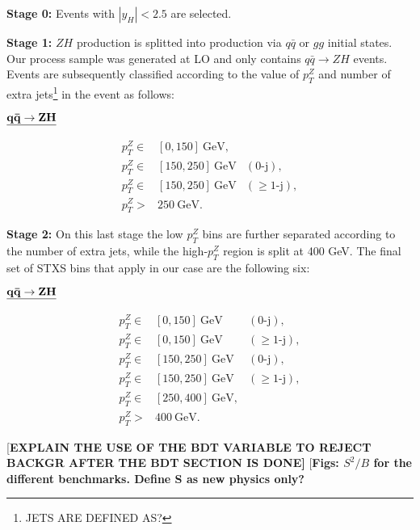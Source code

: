 \documentclass[11pt]{cernrep}
\begin{document}
\begin{itemize}
{\item  {\bf Stage 0:} Events with $\left|y_H\right| <2.5$ are selected.}
%
{\item {\bf Stage 1:} $ZH$ production is splitted into production via $q\bar{q}$ or $gg$ initial states. Our process sample was generated at LO and only contains $q\bar{q}\to ZH$ events. Events are subsequently classified according to the value of $p_T^Z$ and number of extra jets\footnote{JETS ARE DEFINED AS?} in the event as follows:
%
\vspace{0.25cm}
%
\begin{center}
${\bf \underline{q\bar{q}\to ZH}}$
\end{center}
\begin{eqnarray}
p_T^Z \in& [0,150]~\mathrm{GeV},& \nonumber\\
%
p_T^Z \in& [150,250]~\mathrm{GeV}&(0\mbox{-}\mathrm{j}),\\
%
p_T^Z \in& [150,250]~\mathrm{GeV}&(\geq 1\mbox{-}\mathrm{j}),\nonumber\\
%
p_T^Z >&250~\mathrm{GeV}.\nonumber&
\end{eqnarray}
}
%
%
{\item {\bf Stage 2:} On this last stage the low $p_T^Z$ bins are further separated according to the number of extra jets, while the high-$p_T^Z$ region is split at 400 GeV. The final set of STXS bins that apply in our case are the following six:
%
\vspace{0.25cm}
%
\begin{center}
${\bf \underline{q\bar{q}\to ZH}}$
\end{center}
\begin{eqnarray}
p_T^Z \in& [0,150]~\mathrm{GeV}&(0\mbox{-}\mathrm{j}),\nonumber\\
%
p_T^Z \in& [0,150]~\mathrm{GeV}&(\geq 1\mbox{-}\mathrm{j}),\nonumber\nonumber\\
%
p_T^Z \in& [150,250]~\mathrm{GeV}&(0\mbox{-}\mathrm{j}),\\
%
p_T^Z \in& [150,250]~\mathrm{GeV}&(\geq 1\mbox{-}\mathrm{j}),\nonumber\\
%
p_T^Z \in& [250,400]~\mathrm{GeV},&\nonumber\\
%
p_T^Z >&400~\mathrm{GeV}.\nonumber&
\end{eqnarray}
}
\end{itemize}
%
{[\bf EXPLAIN THE USE OF THE BDT VARIABLE TO REJECT BACKGR AFTER THE BDT SECTION IS DONE]}
{[\bf Figs: $S^2/B$ for the different benchmarks. Define S as new physics only?} 
\end{document}
